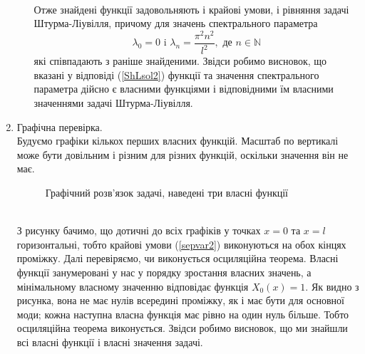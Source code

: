 \begin{enumerate}[wide, labelindent=0pt]
\begin{enumerate}
\begin{equation*}
\begin{aligned}
            \end{aligned} 
        \end{equation*}
        Отже знайдені функції задовольняють і крайові умови, і рівняння задачі Штурма-Ліувілля, причому для значень спектрального параметра \begin{equation}
        \lambda_0 = 0 \text{ i }\lambda_n = \frac{\pi^2 n^2}{l^2}, \text{ де } n \in \mathbb{N}
        \end{equation}які співпадають з раніше знайденими. Звідси робимо висновок, що вказані у відповіді (\ref{ShLsol2}) функції та значення спектрального параметра дійсно є власними функціями і відповідними їм власними значеннями задачі Штурма-Ліувілля.
    \end{enumerate}
    \item Графічна перевірка.\\
    Будуємо графіки кількох перших власних функцій. Масштаб по вертикалі може бути довільним і різним для різних функцій, оскільки значення він не має.
    \begin{figure}[h]
        \centering
        \caption{Графічний розв'язок задачі, наведені три власні функції}        
    \end{figure}\\
     З рисунку бачимо, що дотичні до всіх графіків у точках $x = 0$ та $x = l$ горизонтальні, тобто крайові умови (\ref{sepvar2}) виконуються на обох кінцях проміжку. Далі перевіряємо, чи виконується осциляційна теорема. Власні функції занумеровані у нас у порядку зростання власних значень, а мінімальному власному значенню відповідає функція $X_0(x) = 1$. Як видно з рисунка, вона не має нулів всередині проміжку, як і має бути для основної моди; кожна наступна власна функція має рівно на один нуль більше. Тобто осциляційна теорема виконується. Звідси робимо висновок, що ми знайшли всі власні функції і власні значення задачі.  \\
   
\end{enumerate}

